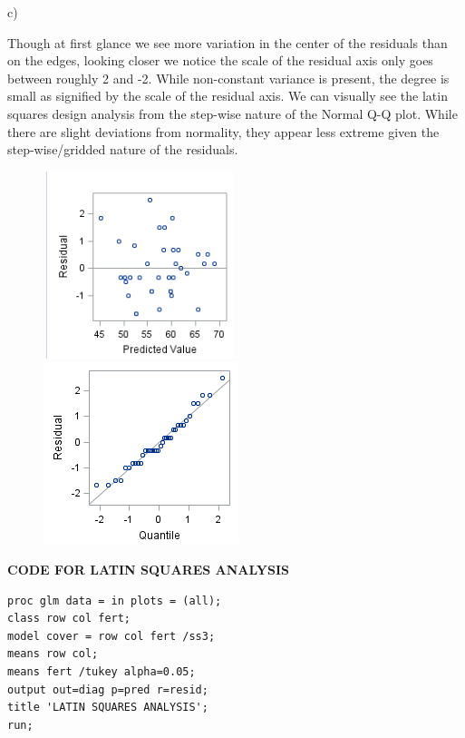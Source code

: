 \documentclass{article}\usepackage[]{graphicx}\usepackage[]{color}
\begin{document}
\begin{enumerate}
\begin{enumerate}
\newpage

c)

Though at first glance we see more variation in the center of the residuals than on the edges, looking closer we notice the scale of the residual axis only goes between roughly 2 and -2. While non-constant variance is present, the degree is small as signified by the scale of the residual axis. We can visually see the latin squares design analysis from the step-wise nature of the Normal Q-Q plot. While there are slight deviations from normality, they appear less extreme given the step-wise/gridded nature of the residuals.

\begin{figure}
\centering
\begin{minipage}{.5\textwidth}
\includegraphics{latin1c}
\end{minipage}%
\begin{minipage}{.5\textwidth}
\centering
\includegraphics{latinQQ}
\end{minipage}
\end{figure}

{\bf CODE FOR LATIN SQUARES ANALYSIS}

\begin{verbatim}
proc glm data = in plots = (all);
class row col fert;
model cover = row col fert /ss3;
means row col;
means fert /tukey alpha=0.05;
output out=diag p=pred r=resid;
title 'LATIN SQUARES ANALYSIS';
run;
\end{verbatim}


\end{enumerate}
\end{enumerate}
\end{document}
